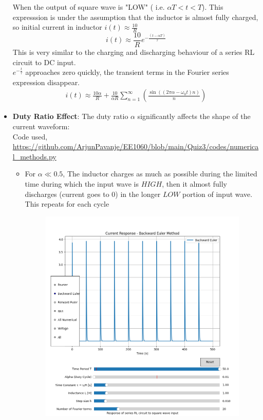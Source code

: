 \documentclass[12pt,a4paper]{report}
\begin{document}
\begin{itemize}
    When the output of square wave is "LOW" ( i.e. $\alpha T < t < T$). This expresssion is under the assumption that the inductor is almost fully charged, so initial current in inductor $i(t) \approx \frac{10}{R}$
    \begin{equation}
    i(t) \approx \frac{10}{R}e^{-\frac{(t-\alpha T)}{\tau}}
    \end{equation}
    This is very similar to the charging and discharging behaviour of a series RL circuit to DC input. \\
    $e^{-\frac{t}{\tau}}$ approaches zero quickly, the transient terms in the Fourier series expression disappear.
    \begin{align}
        i(t)  \approx \frac{10\alpha}{R} + \frac{10}{\alpha R} \sum_{n=1}^{\infty} \left(\frac{\sin ((2\pi \alpha - \omega_0 t)n)}{n}\right)
    \end{align}
    \item \textbf{Duty Ratio Effect}: The duty ratio $\alpha$ significantly affects the shape of the current waveform:\\
    Code used, \url{https://github.com/ArjunPavanje/EE1060/blob/main/Quiz3/codes/numerical_methods.py}
    \begin{itemize}
        \item For $\alpha \ll 0.5$, The inductor charges as much as possible during the limited time during which the input wave is $HIGH$, then it almost fully discharges (current goes to $0$) in the longer $LOW$ portion of input wave. This repeats for each cycle
        \pagebreak
        \begin{figure}[h!]
	   \centering
	   \includegraphics[scale=0.6]{figs/tau<<T-1.png}

\end{figure}
\end{itemize}
\end{itemize}
\end{document}
